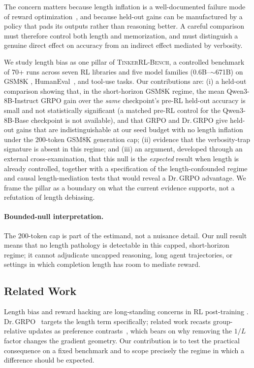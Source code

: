 \documentclass{article}
\newcommand{\ours}{\textsc{TinkerRL-Bench}}
\begin{document}
The concern matters because length inflation is a well-documented failure mode of
reward optimization~\citep{ouyang2022training, christiano2017deeprlhf}, and because
held-out gains can be manufactured by a policy that pads its outputs rather than
reasoning better. A careful comparison must therefore control both length and
memorization, and must distinguish a genuine direct effect on accuracy from an
indirect effect mediated by verbosity.

We study length bias as one pillar of \ours{}, a controlled benchmark of 70+ runs
across seven RL libraries and five model families ($0.6$B--$\sim$671B) on GSM8K
\citep{cobbe2021training}, HumanEval~\citep{chen2021codex}, and tool-use tasks. Our
contributions are: (i) a held-out comparison showing that, in the short-horizon
GSM8K regime, the mean Qwen3-8B-Instruct GRPO gain over the \emph{same} checkpoint's
pre-RL held-out accuracy is small and not statistically significant (a matched pre-RL
control for the Qwen3-8B-Base checkpoint is not available), and that GRPO and Dr.\,GRPO give held-out gains
that are indistinguishable at our seed budget with no length inflation under the
200-token GSM8K generation cap; (ii) evidence that the verbosity-trap signature is
absent in this regime; and (iii) an argument, developed through an external
cross-examination, that this null is the \emph{expected} result when length is
already controlled, together with a specification of the length-confounded regime
and causal length-mediation tests that would reveal a Dr.\,GRPO advantage. We frame
the pillar as a boundary on what the current evidence supports, not a refutation of
length debiasing.

\paragraph{Bounded-null interpretation.}
The 200-token cap is part of the estimand, not a nuisance detail. Our null result
means that no length pathology is detectable in this capped, short-horizon regime;
it cannot adjudicate uncapped reasoning, long agent trajectories, or settings in
which completion length has room to mediate reward.

\subsection{Related Work}
\label{sec:p4-related}
Length bias and reward hacking are long-standing concerns in RL post-training
\citep{ouyang2022training, christiano2017deeprlhf, ahmadian2024backtobasics}.
Dr.\,GRPO~\citep{tong2025drgrpo} targets the length term specifically; related work
recasts group-relative updates as preference contrasts~\citep{wu2025grpo_dpo, liu2026gdpo}, which bears on why removing the $1/L$ factor changes the gradient
geometry. Our contribution is to test the practical consequence on a fixed
benchmark and to scope precisely the regime in which a difference should be
expected.
\end{document}
